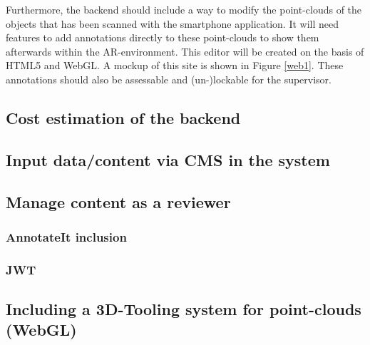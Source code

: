 Furthermore, the backend should include a way to modify the point-clouds of the objects that has been scanned with the smartphone application. It will need features to add annotations directly to these point-clouds to show them afterwards within the \ac{AR}-environment. This editor will be created on the basis of \ac{HTML5} and \ac{WebGL}. A mockup of this site is shown in Figure \ref{web1}. These annotations should also be assessable and (un-)lockable for the supervisor. 

\subsection{Cost estimation of the backend}

\subsection{Input data/content via CMS in the system}

\subsection{Manage content as a reviewer}

\subsubsection{AnnotateIt inclusion}

\subsubsection{JWT}

\subsection{Including a 3D-Tooling system for point-clouds (WebGL)}

